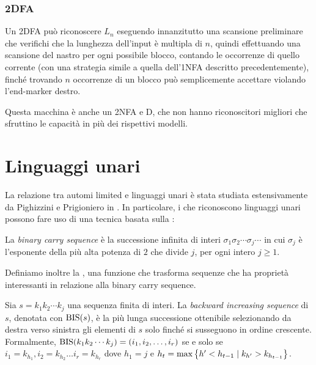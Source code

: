 \subsubsection{2DFA}
Un 2DFA può riconoscere $L_n$ eseguendo innanzitutto una scansione preliminare che verifichi che la lunghezza dell'input è multipla di $n$, quindi effettuando una scansione del nastro per ogni possibile blocco, contando le occorrenze di quello corrente (con una strategia simile a quella dell'1NFA descritto precedentemente), finché trovando $n$ occorrenze di un blocco può semplicemente accettare violando l'end-marker destro.

Questa macchina è anche un 2NFA e D, che non hanno riconoscitori migliori che sfruttino le capacità in più dei rispettivi modelli.



\section{Linguaggi unari}
La relazione tra automi limited e linguaggi unari è stata studiata estensivamente da Pighizzini e Prigioniero in \cite{Pighizzini:19:limitedunary}. In particolare, i  che riconoscono linguaggi unari possono fare uso di una tecnica basata sulla :
\begin{defin}
	La \emph{binary carry sequence} è la successione infinita di interi $\sigma_1\sigma_2\cdots\sigma_j\cdots$ in cui $\sigma_j$ è l'esponente della più alta potenza di $2$ che divide $j$, per ogni intero $j\geq1$.
\end{defin}

Definiamo inoltre la , una funzione che trasforma sequenze che ha proprietà interessanti in relazione alla binary carry sequence.
\begin{defin}
	Sia $s=k_1k_2\cdots k_j$ una sequenza finita di interi. La \emph{backward increasing sequence} di $s$, denotata con $\mathrm{BIS}(s)$, è la più lunga successione ottenibile selezionando da destra verso sinistra gli elementi di $s$ solo finché si susseguono in ordine crescente. Formalmente, $\mathrm{BIS}(k_1k_2\cdots k_j)=(i_1,i_2,\dots,i_r)$ se e solo se $i_1=k_{h_1},i_2=k_{h_2}\dots i_r=k_{h_r}$ dove $h_1=j$ e $h_t=\max\left\{ h'<h_{t-1}\mid k_{h'}>k_{h_{t-1}} \right\}$.
\end{defin}

